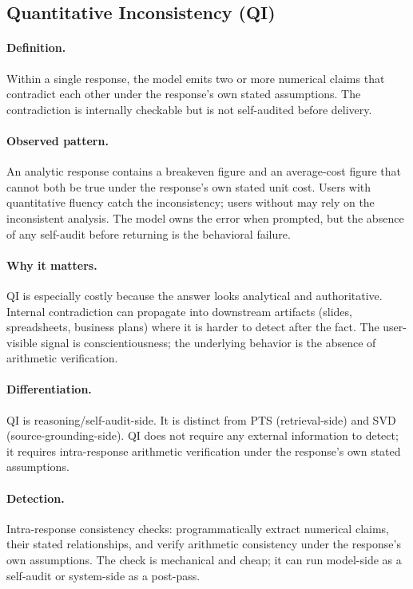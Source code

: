 \documentclass[11pt]{article}
\begin{document}
\subsection{Quantitative Inconsistency (QI)}
\paragraph{Definition.} Within a single response, the model emits two or more numerical claims that contradict each other under the response's own stated assumptions. The contradiction is internally checkable but is not self-audited before delivery.

\paragraph{Observed pattern.} An analytic response contains a breakeven figure and an average-cost figure that cannot both be true under the response's own stated unit cost. Users with quantitative fluency catch the inconsistency; users without may rely on the inconsistent analysis. The model owns the error when prompted, but the absence of any self-audit before returning is the behavioral failure.

\paragraph{Why it matters.} QI is especially costly because the answer looks analytical and authoritative. Internal contradiction can propagate into downstream artifacts (slides, spreadsheets, business plans) where it is harder to detect after the fact. The user-visible signal is conscientiousness; the underlying behavior is the absence of arithmetic verification.

\paragraph{Differentiation.} QI is reasoning/self-audit-side. It is distinct from PTS (retrieval-side) and SVD (source-grounding-side). QI does not require any external information to detect; it requires intra-response arithmetic verification under the response's own stated assumptions.

\paragraph{Detection.} Intra-response consistency checks: programmatically extract numerical claims, their stated relationships, and verify arithmetic consistency under the response's own assumptions. The check is mechanical and cheap; it can run model-side as a self-audit or system-side as a post-pass.
\end{document}
